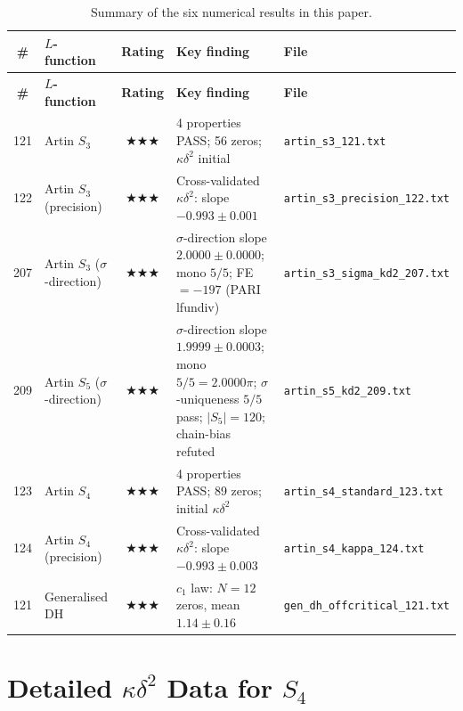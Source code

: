 \documentclass[11pt, a4paper]{article}
\theoremstyle{plain}
\theoremstyle{definition}
\newcommand{\kap}{\kappa}             %
\begin{document}
\begin{longtable}{@{}clcp{5.5cm}l@{}}
\caption{Summary of the six numerical results in this paper.}
\label{tab:summary} \\
\toprule
\textbf{\#} & \textbf{$L$-function} & \textbf{Rating}
  & \textbf{Key finding} & \textbf{File} \\
\midrule
\endfirsthead
\toprule
\textbf{\#} & \textbf{$L$-function} & \textbf{Rating}
  & \textbf{Key finding} & \textbf{File} \\
\midrule
\endhead
121 & Artin $S_{3}$ & $\bigstar\!\bigstar\!\bigstar$ &
  4 properties PASS; 56 zeros; $\kap\delta^{2}$ initial &
  \texttt{artin\_s3\_121.txt} \\
122 & Artin $S_{3}$ (precision) & $\bigstar\!\bigstar\!\bigstar$ &
  Cross-validated $\kap\delta^{2}$: slope $-0.993\pm0.001$ &
  \texttt{artin\_s3\_precision\_122.txt} \\
207 & Artin $S_{3}$ ($\sigma$-direction) & $\bigstar\!\bigstar\!\bigstar$ &
  $\sigma$-direction slope $2.0000\pm0.0000$; mono $5/5$;
  FE$=-197$ (PARI lfundiv) &
  \texttt{artin\_s3\_sigma\_kd2\_207.txt} \\
209 & Artin $S_{5}$ ($\sigma$-direction) & $\bigstar\!\bigstar\!\bigstar$ &
  $\sigma$-direction slope $1.9999\pm0.0003$; mono $5/5=2.0000\pi$;
  $\sigma$-uniqueness $5/5$ pass; $|S_5|=120$; chain-bias refuted &
  \texttt{artin\_s5\_kd2\_209.txt} \\
123 & Artin $S_{4}$ & $\bigstar\!\bigstar\!\bigstar$ &
  4 properties PASS; 89 zeros; initial $\kap\delta^{2}$ &
  \texttt{artin\_s4\_standard\_123.txt} \\
124 & Artin $S_{4}$ (precision) & $\bigstar\!\bigstar\!\bigstar$ &
  Cross-validated $\kap\delta^{2}$: slope $-0.993\pm0.003$ &
  \texttt{artin\_s4\_kappa\_124.txt} \\
121 & Generalised DH & $\bigstar\!\bigstar\!\bigstar$ &
  $c_{1}$ law: $N{=}12$ zeros, mean $1.14\pm0.16$ &
  \texttt{gen\_dh\_offcritical\_121.txt} \\
\bottomrule
\end{longtable}


\section{Detailed $\kap\delta^{2}$ Data for $S_{4}$}
\label{app:s4-data}
\end{document}

